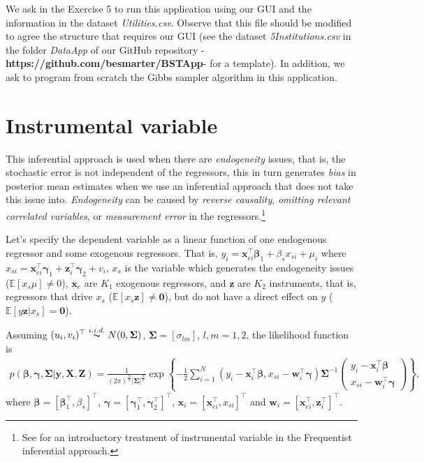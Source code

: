 We ask in the Exercise 5 to run this application using our GUI and the information in the dataset \textit{Utilities.csv}. Observe that this file should be modified to agree the structure that requires our GUI (see the dataset \textit{5Institutions.csv} in the folder \textit{DataApp} of our GitHub repository -\textbf{https://github.com/besmarter/BSTApp}- for a template). In addition, we ask to program from scratch the Gibbs sampler algorithm in this application.  

\section{Instrumental variable}\label{sec73}

This inferential approach is used when there are \textit{endogeneity} issues, that is, the stochastic error is not independent of the regressors, this in turn generates \textit{bias} in posterior mean estimates when we use an inferential approach that does not take this issue into. \textit{Endogeneity} can be caused by \textit{reverse causality}, \textit{omitting relevant correlated variables}, or \textit{measurement error} in  the regressors.\footnote{See \cite[Chap. ~15]{wooldridge2016introductory} for an introductory treatment of instrumental variable in the Frequentist inferential approach.}

Let's specify the dependent variable as a linear function of one endogenous regressor and some exogenous regressors. That is, $y_{i} =\bm{x}_{ei}^{\top}\bm{\beta}_1+\beta_sx_{si}+\mu_{i}$ where $x_{si} =\bm{ x}_{ei}^{\top}\bm{\gamma}_1+\bm{z}_i^{\top}\bm{\gamma}_2+v_{i}$, ${x}_{s}$ is the variable which generates the endogeneity issues ($\mathbb{E}[x_{s}\mu]\neq 0$), $\bm{x}_e$ are $K_1$ exogenous regressors, and $\bm{z}$ are $K_2$ instruments, that is, regressors that drive $x_s$ ($\mathbb{E}[x_{s}\bm{z}]\neq \bm{0}$), but do not have a direct effect on $y$ ($\mathbb{E}[y\bm{z}|x_s]= \bm{0}$).

Assuming $(u_{i},v_i)^{\top}\stackrel{i.i.d.} {\thicksim} {N}(0,\bm{\Sigma})$, $\bm{\Sigma}=[\sigma_{lm}]$, $l,m=1,2$, the likelihood function is
\begin{align*}
	p(\bm{\beta},\bm{\gamma},\bm{\Sigma}|\bm{y},\bm{X},\bm{Z})=\frac{1}{(2\pi)^\frac{N}{2}|\bm{\Sigma}|^\frac{N}{2}}\exp\left\{-\frac{1}{2}\sum_{i=1}^N(y_i-\bm{x}_i^{\top}\bm{\beta}, x_{si} -\bm{w}_i^{\top}\bm{\gamma})\bm{\Sigma}^{-1}
	\begin{pmatrix}
		y_i-\bm{x}_i^{\top}\bm{\beta} \\
		x_{si}-\bm{w}_i^{\top}\bm{\gamma}
	\end{pmatrix}
	\right\},
\end{align*}
where $\bm{\beta}=\left[\bm{\beta}_1^{\top},\beta_s\right]^{\top}$, $\bm{\gamma}=\left[\bm{\gamma}_1^{\top},\bm{\gamma}_2^{\top}\right]^{\top}$, $\bm{x}_i=\left[\bm{x}_{ei}^{\top},x_{si}\right]^{\top}$ and $\bm{w}_i=\left[\bm{x}_{ei}^{\top},\bm{z}_{i}^{\top}\right]^{\top}$.

